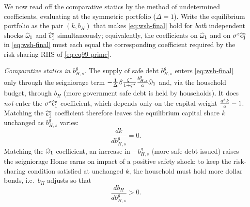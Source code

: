 \medskip
We now read off the comparative statics by the method of undetermined
coefficients, evaluating at the symmetric portfolio ($\Delta=1$). Write the
equilibrium portfolio as the pair $(k,b_H)$ that makes \eqref{eq:wsh-final} hold
for \emph{both} independent shocks $\widehat{\omega}_1$ and $\widehat{\epsilon}^z_1$
simultaneously; equivalently, the coefficients on $\widehat{\omega}_1$ and on
$\sigma^z\widehat{\epsilon}^z_1$ in \eqref{eq:wsh-final} must each equal the
corresponding coefficient required by the risk-sharing RHS of
\eqref{eq:eq99-prime}.

\emph{Comparative statics in $b^g_{H,s}$.} The supply of safe debt $b^g_{H,s}$
enters \eqref{eq:wsh-final} only through the seigniorage term
$-\frac{1}{\Delta}\beta\frac{\zeta^{*}}{1+\zeta^{*}}\frac{b^g_{H,s}}{a}\widehat{\omega}_1$ and,
via the household budget, through $b_H$ (more government safe debt is held by
households). It does \emph{not} enter the $\sigma^z\widehat{\epsilon}^z_1$ coefficient,
which depends only on the capital weight $\frac{q^{k} k}{a}-1$. Matching the
$\widehat{\epsilon}^z_1$ coefficient therefore leaves the equilibrium capital share
$k$ unchanged as $b^g_{H,s}$ varies:
\begin{equation}
\frac{dk}{db^g_{H,s}} = 0. \label{eq:cs-k-bg}
\end{equation}
Matching the $\widehat{\omega}_1$ coefficient, an increase in $-b^g_{H,s}$ (more safe
debt issued) raises the seigniorage Home earns on impact of a positive safety
shock; to keep the risk-sharing condition satisfied at unchanged $k$, the
household must hold more dollar bonds, i.e.\ $b_H$ adjusts so that
\begin{equation}
\frac{db_H}{db^g_{H,s}} > 0. \label{eq:cs-bH-bg}
\end{equation}

